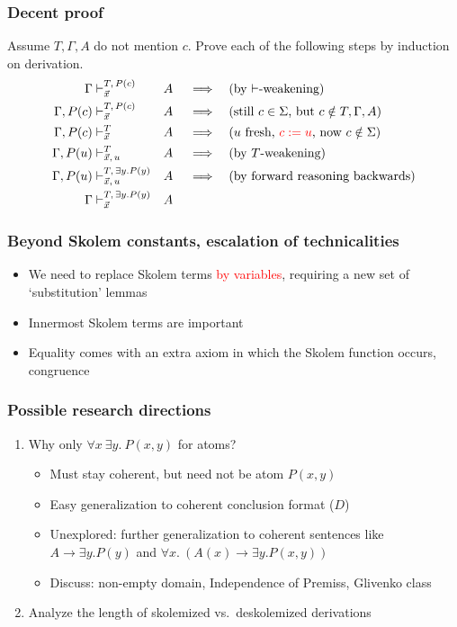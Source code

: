 \documentclass[handout,11pt,hyperref ={colorlinks = true, urlcolor = red}]{beamer}
\newcommand{\red}[1]{\textcolor{red}{#1}}
\begin{document}
\begin{frame}
\frametitle{Decent proof}
Assume $T,\Gamma,A$ do not mention $c$.
Prove each of the following steps by induction on derivation.
    \begin{alignat*}{4}
    \Gamma&\vdash_{\vec{x}}^{T,\,P(c)}&& A  && \implies &&
    \text{(by $\vdash$-weakening)} \\
    \Gamma,P(c)&\vdash_{\vec{x}}^{T,\,P(c)} && A && \implies &&
    \text{(still $c\in\Sigma$, but $c\notin T,\Gamma,A$)} \\
    \Gamma,P(c)&\vdash_{\vec{x}}^{T} && A && \implies &&
    \text{($u$ fresh, \red{$c:=u$}, now $c\notin \Sigma$)} \\
    \Gamma,P(u)&\vdash_{\vec{x},\,u}^{T} && A && \implies &&
    \text{(by $T$-weakening)} \\
    \Gamma,P(u)&\vdash_{\vec{x},\,u}^{T,\,\exists y.P(y)} && A && \implies &&
    \text{(by forward reasoning backwards)} \\
    \Gamma&\vdash_{\vec{x}}^{T,\,\exists y.P(y)} &&A %
    \end{alignat*}
\end{frame}

\begin{frame}
\frametitle{Beyond Skolem constants, escalation of technicalities}
 \begin{itemize}[<+->]
    \item We need to replace Skolem terms \red{by variables},
    requiring a new set of `substitution' lemmas
    \item Innermost Skolem terms are important
    \item Equality comes with an extra axiom in which the Skolem function
    occurs, congruence    
 \end{itemize}
\end{frame}

\begin{frame}
\frametitle{Possible research directions}
 \begin{enumerate}[<+->] 
    \item Why only $\forall{x}~\exists y.~P({x},y)$ for atoms?
    \begin{itemize}[<+->]
      \item Must stay coherent, but need not be atom $P({x},y)$
      \item Easy generalization to coherent conclusion format ($D$)
      \item Unexplored: further generalization to coherent sentences
      like $A \to \exists y. P(y)$ and
           $\forall x.~(A(x) \to \exists y. P(x,y))$
      \item Discuss: non-empty domain, Independence of Premiss, Glivenko class
    \end{itemize}
    \item Analyze the length of skolemized vs.\ deskolemized derivations
 \end{enumerate}
\end{frame}
\end{document}
